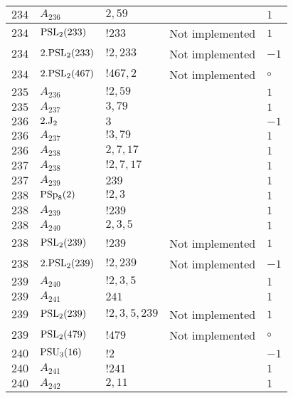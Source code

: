\documentclass[a4paper, 11pt]{article}
\begin{document}
\begin{longtable}{lllll}
        $ 234 $ & $ A_{236} $ & $ 2, 59 $ & $ ~ $ & $ 1$ \\ \hline
        $ 234 $ & $ {\rm PSL}_{2}(233) $ & $ !233 $ &  Not implemented & $ 1$ \\ \hline
        $ 234 $ & $ 2.{\rm PSL}_{2}(233) $ & $ !2, 233 $ &  Not implemented & $ -1$ \\ \hline
        $ 234 $ & $ 2.{\rm PSL}_{2}(467) $ & $ !467, 2 $ &  Not implemented &  $\circ$ \\ \hline
        $ 235 $ & $ A_{236} $ & $ !2, 59 $ & $ ~ $ & $ 1$ \\ \hline
        $ 235 $ & $ A_{237} $ & $ 3, 79 $ & $ ~ $ & $ 1$ \\ \hline
        $ 236 $ & $ 2.{\rm J}_2 $ & $ 3 $ & $ ~ $ & $ -1$ \\ \hline
        $ 236 $ & $ A_{237} $ & $ !3, 79 $ & $ ~ $ & $ 1$ \\ \hline
        $ 236 $ & $ A_{238} $ & $ 2, 7, 17 $ & $ ~ $ & $ 1$ \\ \hline
        $ 237 $ & $ A_{238} $ & $ !2, 7, 17 $ & $ ~ $ & $ 1$ \\ \hline
        $ 237 $ & $ A_{239} $ & $ 239 $ & $ ~ $ & $ 1$ \\ \hline
        $ 238 $ & $ {\rm PSp}_{8}(2) $ & $ ! 2,3 $ & $ ~ $ & $ 1$ \\ \hline
        $ 238 $ & $ A_{239} $ & $ !239 $ & $ ~ $ & $ 1$ \\ \hline
        $ 238 $ & $ A_{240} $ & $ 2, 3, 5 $ & $ ~ $ & $ 1$ \\ \hline
        $ 238 $ & $ {\rm PSL}_{2}(239) $ & $ !239 $ &  Not implemented & $ 1$ \\ \hline
        $ 238 $ & $ 2.{\rm PSL}_{2}(239) $ & $ !2, 239 $ &  Not implemented & $ -1$ \\ \hline
        $ 239 $ & $ A_{240} $ & $ !2, 3, 5 $ & $ ~ $ & $ 1$ \\ \hline
        $ 239 $ & $ A_{241} $ & $ 241 $ & $ ~ $ & $ 1$ \\ \hline
        $ 239 $ & $ {\rm PSL}_{2}(239) $ & $ !2, 3, 5, 239 $ &  Not implemented & $ 1$ \\ \hline
        $ 239 $ & $ {\rm PSL}_{2}(479) $ & $ !479 $ &  Not implemented &  $\circ$ \\ \hline
        $ 240 $ & $ {\rm PSU}_{3}(16) $ & $ ! 2 $ & $ ~ $ & $ -1$ \\ \hline
        $ 240 $ & $ A_{241} $ & $ !241 $ & $ ~ $ & $ 1$ \\ \hline
        $ 240 $ & $ A_{242} $ & $ 2, 11 $ & $ ~ $ & $ 1$ \\ \hline

\end{longtable}
\end{document}
